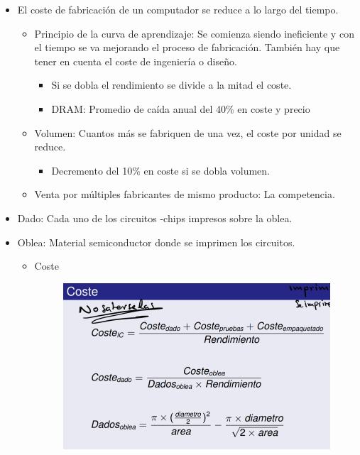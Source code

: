 \documentclass[12pt, twoside, openright]{report} %
\begin{document}
  \begin{itemize}
  
  \item
    El coste de fabricación de un computador se reduce a lo largo del
    tiempo.

    \begin{itemize}
    
    \item
      Principio de la curva de aprendizaje: Se comienza siendo
      ineficiente y con el tiempo se va mejorando el proceso de
      fabricación. También hay que tener en cuenta el coste de
      ingeniería o diseño.

      \begin{itemize}
      
      \item
        Si se dobla el rendimiento se divide a la mitad el coste.
      \item
        DRAM: Promedio de caída anual del 40\% en coste y precio
      \end{itemize}
    \item
      Volumen: Cuantos más se fabriquen de una vez, el coste por unidad
      se reduce.

      \begin{itemize}
      
      \item
        Decremento del 10\% en coste si se dobla volumen.
      \end{itemize}
    \item
      Venta por múltiples fabricantes de mismo producto: La competencia.
    \end{itemize}
  \item
    Dado: Cada uno de los circuitos -chips impresos sobre la oblea.
  \item
    Oblea: Material semiconductor donde se imprimen los circuitos.
\pagebreak
    \begin{itemize}
    \item
      Coste

      \begin{figure}[H]
        {\includegraphics[scale=.35]{Untitled 6.png}}
      \end{figure}
    \end{itemize}
  \end{itemize}
\end{document}
